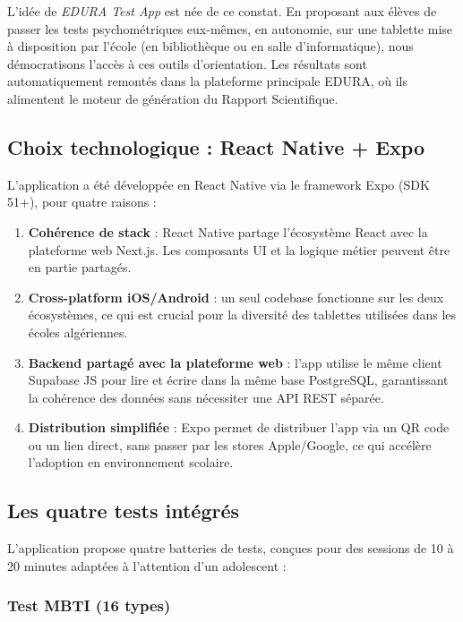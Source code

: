 \documentclass[12pt,a4paper,oneside]{report}
\begin{document}
L'idée de \textit{EDURA Test App} est née de ce constat. En proposant aux élèves de passer les tests psychométriques eux-mêmes, en autonomie, sur une tablette mise à disposition par l'école (en bibliothèque ou en salle d'informatique), nous démocratisons l'accès à ces outils d'orientation. Les résultats sont automatiquement remontés dans la plateforme principale EDURA, où ils alimentent le moteur de génération du Rapport Scientifique.

\subsection{Choix technologique : React Native + Expo}

L'application a été développée en React Native via le framework Expo (SDK 51+), pour quatre raisons :

\begin{enumerate}
  \item \textbf{Cohérence de stack} : React Native partage l'écosystème React avec la plateforme web Next.js. Les composants UI et la logique métier peuvent être en partie partagés.
  \item \textbf{Cross-platform iOS/Android} : un seul codebase fonctionne sur les deux écosystèmes, ce qui est crucial pour la diversité des tablettes utilisées dans les écoles algériennes.
  \item \textbf{Backend partagé avec la plateforme web} : l'app utilise le même client Supabase JS pour lire et écrire dans la même base PostgreSQL, garantissant la cohérence des données sans nécessiter une API REST séparée.
  \item \textbf{Distribution simplifiée} : Expo permet de distribuer l'app via un QR code ou un lien direct, sans passer par les stores Apple/Google, ce qui accélère l'adoption en environnement scolaire.
\end{enumerate}

\subsection{Les quatre tests intégrés}

L'application propose quatre batteries de tests, conçues pour des sessions de 10 à 20 minutes adaptées à l'attention d'un adolescent :

\subsubsection{Test MBTI (16 types)}
\end{document}
